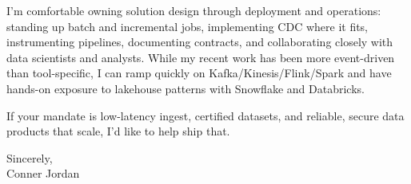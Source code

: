 \documentclass[letterpaper,11pt]{article}
\begin{document}
\vspace{16pt}

I’m comfortable owning solution design through deployment and operations: standing up batch and incremental jobs, implementing CDC where it fits, instrumenting pipelines, documenting contracts, and collaborating closely with data scientists and analysts. While my recent work has been more event-driven than tool-specific, I can ramp quickly on Kafka/Kinesis/Flink/Spark and have hands-on exposure to lakehouse patterns with Snowflake and Databricks.

\vspace{16pt}

If your mandate is low-latency ingest, certified datasets, and reliable, secure data products that scale, I’d like to help ship that.

\vspace{16pt}

Sincerely,\\
Conner Jordan
\end{document}

